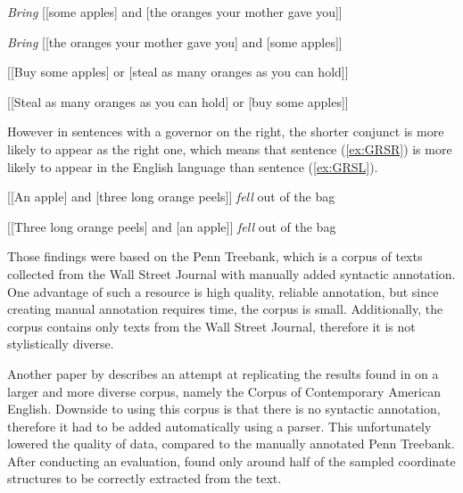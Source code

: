 \begin{exe}

\ex\label{ex:GL}
\begin{xlist}
\ex\label{ex:GLSL}
\textsl{Bring} [[some apples] and [the oranges your mother gave you]]

\ex\label{ex:GLSR}
\textsl{Bring} [[the oranges your mother gave you] and [some apples]]
\end{xlist}

\ex\label{ex:GN}
\begin{xlist}
\ex\label{ex:GNSL}
[[Buy some apples] or [steal as many oranges as you can hold]]

\ex\label{ex:GNSR}
[[Steal as many oranges as you can hold] or [buy some apples]]
\end{xlist}

\end{exe}

However in sentences with a governor on the right, the shorter conjunct is more likely to appear as the right one, which means that sentence (\ref{ex:GRSR}) is more likely to appear in the English language than sentence (\ref{ex:GRSL}).

\begin{exe}

\ex\label{ex:GR}
\begin{xlist}
\ex\label{ex:GRSL}
[[An apple] and [three long orange peels]] \textsl{fell} out of the bag

\ex\label{ex:GRSR}
[[Three long orange peels] and [an apple]] \textsl{fell} out of the bag
\end{xlist}

\end{exe}

Those findings were based on the Penn Treebank, which is a corpus of texts collected from the Wall Street Journal with manually added syntactic annotation. One advantage of such a resource is high quality, reliable annotation, but since creating manual annotation requires time, the corpus is small. Additionally, the corpus contains only texts from the Wall Street Journal, therefore it is not stylistically diverse. 

Another paper by \cite{pbg2023} describes an attempt at replicating the results found in \cite{prz:woz:23} on a larger and more diverse corpus, namely the Corpus of Contemporary American English. Downside to using this corpus is that there is no syntactic annotation, therefore it had to be added automatically using a parser. This unfortunately lowered the quality of data, compared to the manually annotated Penn Treebank. After conducting an evaluation, \cite{pbg2023} found only around half of the sampled coordinate structures to be correctly extracted from the text. 

